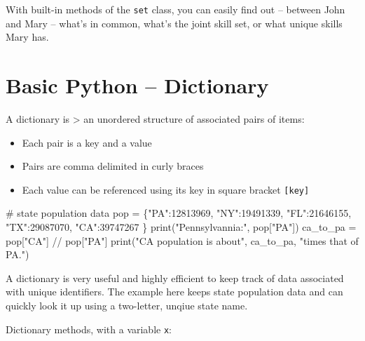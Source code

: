 \documentclass[
  letterpaper,
]{scrbook}
\newenvironment{Shaded}{\begin{snugshade}}{\end{snugshade}}
\newcommand{\BuiltInTok}[1]{\textcolor[rgb]{0.00,0.23,0.31}{#1}}
\newcommand{\CommentTok}[1]{\textcolor[rgb]{0.37,0.37,0.37}{#1}}
\newcommand{\DecValTok}[1]{\textcolor[rgb]{0.68,0.00,0.00}{#1}}
\newcommand{\NormalTok}[1]{\textcolor[rgb]{0.00,0.23,0.31}{#1}}
\newcommand{\OperatorTok}[1]{\textcolor[rgb]{0.37,0.37,0.37}{#1}}
\newcommand{\StringTok}[1]{\textcolor[rgb]{0.13,0.47,0.30}{#1}}
\providecommand{\tightlist}{%
  \setlength{\itemsep}{0pt}\setlength{\parskip}{0pt}}
\begin{document}
With built-in methods of the \texttt{set} class, you can easily find out
-- between John and Mary -- what's in common, what's the joint skill
set, or what unique skills Mary has.

\section*{Basic Python -- Dictionary}\label{basic-python-dictionary}


A dictionary is \textgreater{} an unordered structure of associated
pairs of items:

\begin{itemize}
\tightlist
\item
  Each pair is a key and a value
\item
  Pairs are comma delimited in curly braces
\item
  Each value can be referenced using its key in square bracket
  \texttt{{[}key{]}}
\end{itemize}

\begin{Shaded}
\begin{Highlighting}[]
\CommentTok{\# state population data}
\NormalTok{pop }\OperatorTok{=}\NormalTok{ \{}\StringTok{"PA"}\NormalTok{:}\DecValTok{12813969}\NormalTok{, }\StringTok{"NY"}\NormalTok{:}\DecValTok{19491339}\NormalTok{, }\StringTok{"FL"}\NormalTok{:}\DecValTok{21646155}\NormalTok{, }\StringTok{"TX"}\NormalTok{:}\DecValTok{29087070}\NormalTok{, }\StringTok{"CA"}\NormalTok{:}\DecValTok{39747267}\NormalTok{ \}}
\BuiltInTok{print}\NormalTok{(}\StringTok{"Pennsylvannia:"}\NormalTok{, pop[}\StringTok{"PA"}\NormalTok{])}
\NormalTok{ca\_to\_pa }\OperatorTok{=}\NormalTok{ pop[}\StringTok{"CA"}\NormalTok{] }\OperatorTok{//}\NormalTok{ pop[}\StringTok{"PA"}\NormalTok{]}
\BuiltInTok{print}\NormalTok{(}\StringTok{"CA population is about"}\NormalTok{, ca\_to\_pa, }\StringTok{"times that of PA."}\NormalTok{)}
\end{Highlighting}
\end{Shaded}

A dictionary is very useful and highly efficient to keep track of data
associated with unique identifiers. The example here keeps state
population data and can quickly look it up using a two-letter, unqiue
state name.

Dictionary methods, with a variable \texttt{x}:
\end{document}
